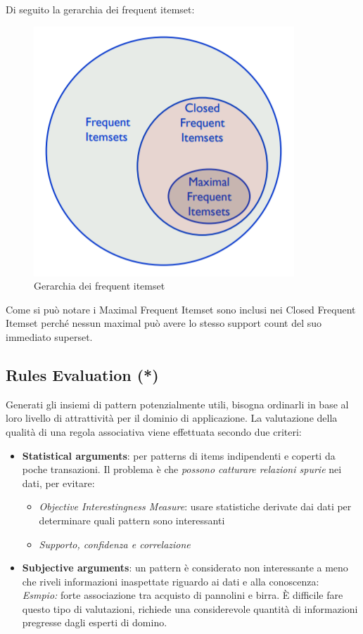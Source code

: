 Di seguito la gerarchia dei frequent itemset:
\begin{figure}[H]
	\centering
	\includegraphics[height=0.45 \linewidth]{association/pict/itemset_freq.png}
	\caption{Gerarchia dei frequent itemset}
\end{figure}

Come si può notare i Maximal Frequent Itemset sono inclusi nei Closed Frequent Itemset perché nessun maximal può avere lo stesso support count del suo immediato superset.

\subsection{Rules Evaluation (*)}
Generati gli insiemi di pattern potenzialmente utili, bisogna ordinarli in base al loro livello di attrattività per il dominio di applicazione. La valutazione della qualità di una regola associativa viene effettuata secondo due criteri:
\begin{itemize}
	\item \textbf{Statistical arguments}: per patterns di items indipendenti e coperti da poche transazioni. Il problema è che \textit{possono catturare relazioni spurie} nei dati, per evitare:
	\begin{itemize}
		\item \textit{Objective Interestingness Measure}: usare statistiche derivate dai dati per determinare quali pattern sono interessanti
		\item \textit{Supporto, confidenza e correlazione}
	\end{itemize}
	\item \textbf{Subjective arguments}: un pattern è considerato non interessante a meno che riveli informazioni inaspettate riguardo ai dati e alla conoscenza:
	\\ \textit{Esmpio:} forte associazione tra acquisto di pannolini e birra. È difficile fare questo tipo di valutazioni, richiede una considerevole quantità di informazioni pregresse dagli esperti di domino.
\end{itemize}

